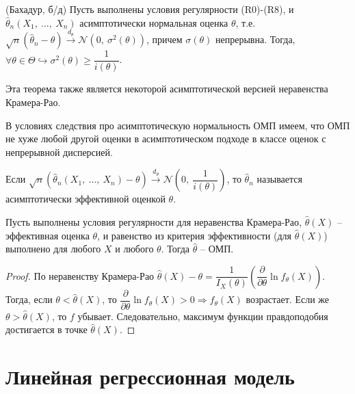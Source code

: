 \begin{theorem}
    (Бахадур, б/д) Пусть выполнены условия регулярности (R0)-(R8), и $\displaystyle \hat{\theta }_{n}( X_{1} ,\ \dotsc ,\ X_{n})$ асимптотически нормальная оценка $\displaystyle \theta $, т.е. $\displaystyle \sqrt{n}(\hat{\theta }_{n} -\theta )\xrightarrow{d_{\theta }}\mathcal{N}\left( 0,\ \sigma ^{2}( \theta )\right)$, причем $\displaystyle \sigma ( \theta )$ непрерывна. Тогда, $\displaystyle \forall \theta \in \Theta \hookrightarrow \sigma ^{2}( \theta ) \geqslant \dfrac{1}{i( \theta )}$.
\end{theorem}
\begin{note}
    Эта теорема также является некоторой асимптотической версией неравенства Крамера-Рао.
\end{note}
\begin{corollary}
    В условиях следствия про асимптотическую нормальность ОМП имеем, что ОМП не хуже любой другой оценки в асимптотическом подходе в классе оценок с непрерывной дисперсией.
\end{corollary}
\begin{definition}
    Если $\displaystyle \sqrt{n}(\hat{\theta }_{n}( X_{1} ,\ \dotsc ,\ X_{n}) -\theta )\xrightarrow{d_{\theta }}\mathcal{N}\left( 0,\ \dfrac{1}{i( \theta )}\right)$, то $\displaystyle \hat{\theta }_{n}$ называется асимптотически эффективной оценкой $\displaystyle \theta $.
\end{definition}
\begin{proposition}
    Пусть выполнены условия регулярности для неравенства Крамера-Рао, $\displaystyle \hat{\theta }( X)$ -- эффективная оценка $\displaystyle \theta $, и равенство из критерия эффективности (для $\displaystyle \hat{\theta }( X)$) выполнено для любого $\displaystyle X$ и любого $\displaystyle \theta $. Тогда $\displaystyle \hat{\theta }$ -- ОМП.
\end{proposition}
\begin{proof}
    По неравенству Крамера-Рао $\displaystyle \hat{\theta }( X) -\theta =\dfrac{1}{I_{X}( \theta )}\left(\dfrac{\partial }{\partial \theta }\ln f_{\theta }( X)\right)$. Тогда, если $\displaystyle \theta < \hat{\theta }( X)$, то $\displaystyle \dfrac{\partial }{\partial \theta }\ln f_{\theta }( X)  >0\Rightarrow f_{\theta }( X)$ возрастает. Если же $\displaystyle \theta  >\hat{\theta }( X)$, то $\displaystyle f$ убывает. Следовательно, максимум функции правдоподобия достигается в точке $\displaystyle \hat{\theta }( X)$.
\end{proof}
\section{Линейная регрессионная модель}

